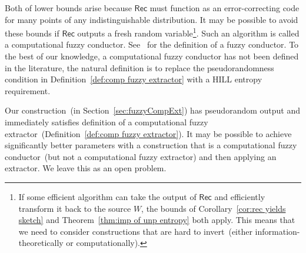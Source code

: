 \documentclass[11pt]{article}
\newcommand{\secref}[1]{\mbox{Section~\ref{#1}}}
\newcommand{\thref}[1]{\mbox{Theorem~\ref{#1}}}
\newcommand{\defref}[1]{\mbox{Definition~\ref{#1}}}
\newcommand{\corref}[1]{\mbox{Corollary~\ref{#1}}}
\newcommand{\class}[1]{{\ensuremath{\mathsf{#1}}}}
\newcommand{\rec}{\ensuremath{\class{Rec}}\xspace}
\begin{document}
Both of lower bounds arise because \rec must function as an error-correcting code for many points of any indistinguishable distribution.  It may be possible to avoid these bounds if \rec outputs a fresh random variable\footnote{If some efficient algorithm can take the output of $\rec$ and efficiently transform it back to the source $W$, the bounds of \corref{cor:rec yields sketch} and \thref{thm:imp of unp entropy} both apply.  This means that we need to consider constructions that are hard to invert~(either information-theoretically or computationally).}.  Such an algorithm is called a computational fuzzy conductor.  See~\cite{KanukurthiR09} for the definition of a fuzzy conductor.  To the best of our knowledge, a computational fuzzy conductor has not been defined in the literature, the natural definition is to replace the pseudorandomness condition in \defref{def:comp fuzzy extractor} with a HILL entropy requirement.  

Our construction~(in \secref{sec:fuzzyCompExt}) has pseudorandom output and immediately satisfies definition of a computational fuzzy extractor~(\defref{def:comp fuzzy extractor}).  It may be possible to achieve significantly better parameters with a construction that is a computational fuzzy conductor~(but not a computational fuzzy extractor) and then applying an extractor.  We leave this as an open problem.
\end{document}
